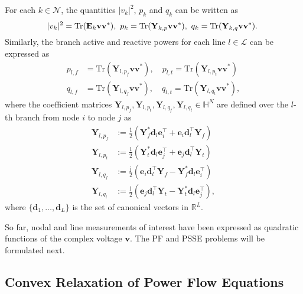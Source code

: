 \documentclass[journal,twoside]{IEEEtran}
\newcommand{\Tr}{\mathrm{Tr}}
\newcommand{\mi}{\mathsf{j}}
\newcommand{\bd}{\mathbf{d}}
\newcommand{\be}{\mathbf{e}}
\newcommand{\bv}{\mathbf{v}}
\newcommand{\bE}{\mathbf{E}}
\newcommand{\bY}{\mathbf{Y}}
\newcommand{\cL}{{\mathcal L}}
\newcommand{\cN}{{\mathcal N}}
\begin{document}
For each $k\in \cN$, the quantities $|v_k|^2$, $p_k$ and $q_k$ can be written as
\begin{equation}\label{nodalQTY}
\hspace{-1mm}
		|v_k|^2  = \Tr(\bE_{k}\bv\bv^{*}),\
		p_k      = \Tr(\bY_{k,p}\bv\bv^{*}),\
		q_k      = \Tr(\bY_{k,q}\bv\bv^{*}).
\end{equation}
Similarly, the branch active and reactive powers for each line $l\in \cL$ can be expressed as
\begin{equation}\label{branchQTY}
	\begin{aligned}
		p_{l,f}  &= \Tr(\bY_{l,p_{f}}\bv\bv^{*}),\quad
		p_{l,t}  = \Tr(\bY_{l,p_{t}}\bv\bv^{*}) \\
		q_{l,f}  &= \Tr(\bY_{l,q_{f}}\bv\bv^{*}),\quad
		q_{l,t}  = \Tr(\bY_{l,q_{t}}\bv\bv^{*}),
	\end{aligned}
\end{equation}
where the coefficient matrices $\bY_{l,p_{f}},\bY_{l,p_{t}},\bY_{l,q_{f}},\bY_{l,q_{t}} \in \mathbb{H}^N$ are defined
over the $l$-th branch from node $i$ to node $j$ as
\begin{subequations}\label{branchM}
	\begin{align}
		\bY_{l,p_{f}}  &:= \frac{1}{2}(\bY^{*}_f\bd_l\be_{i}^{\top}+\be_{i}\bd_l^{\top}\bY_f) \label{Ylpf} \\
		\bY_{l,p_{t}}  &:= \frac{1}{2}(\bY^{*}_t\bd_l\be_{j}^{\top}+\be_{j}\bd_l^{\top}\bY_t) \\
		\bY_{l,q_{f}}  &:= \frac{\mi}{2}(\be_{i}\bd_l^{\top}\bY_f- \bY^{*}_f\bd_l\be_{i}^{\top}) \\
		\bY_{l,q_{t}}  &:= \frac{\mi}{2}(\be_{j}\bd_l^{\top}\bY_t-\bY^{*}_t\bd_l\be_{j}^{\top}),
	\end{align}
\end{subequations}
where $\{\bd_1,\ldots,\bd_L\}$ is the set of  canonical vectors in $\mathbb{R}^{L}$.

So far, nodal and line measurements of interest have been  expressed as quadratic functions of the complex voltage $\bv$.
The  PF and PSSE problems will be formulated next.

\vspace{-2mm}
\subsection{Convex Relaxation of Power Flow Equations}\label{sec:probform}
\end{document}
